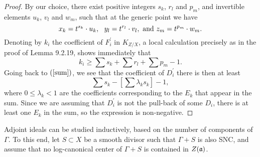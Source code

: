 \documentclass[11pt]{amsart}
\theoremstyle{plain}
\theoremstyle{definition}
\newcommand{\fra}{\frak{a}}
\begin{document}
\begin{proof}
By our choice, there exist positive integers $s_k$, $r_l$ and $p_m$, and invertible elements $u_k$, $v_l$ and $w_m$, such that at the generic point we have 
$$x_k = t^{s_k}\cdot u_k, ~~y_l = t^{r_l}\cdot v_l, {\rm~and~} z_m = t^{p_m}\cdot w_m.$$
Denoting by $k_i$ the coefficient of $F_i^{\prime}$ in $K_{Z/X}$, a local calculation precisely as in the proof of \cite{positivity} Lemma 9.2.19, shows immediately that
$$k_i \ge \sum s_k + \sum r_l + \sum p_m - 1.$$ 
Going back to $(\ref{sum})$, we see that the coefficient of $D_i^{\prime}$ there is then 
at least 
$$\sum s_k - [\sum \lambda_ks_k]  -1,$$
where $0 \le \lambda_k <1$ are the coefficients corresponding to the $E_k$ that appear in the sum. Since we are assuming that $D_i^{\prime}$ is not the pull-back of some $D_i$, there is at least one $E_k$ in the sum, so the expression is non-negative.
\end{proof}

Adjoint ideals can be studied inductively, based on the number of components of $\Gamma$. To this end, let $S\subset X$ be a smooth divisor such that $\Gamma + S$ is also SNC, and assume that no log-canonical center of $\Gamma + S$ is contained in $Z(\fra)$. 
\end{document}
